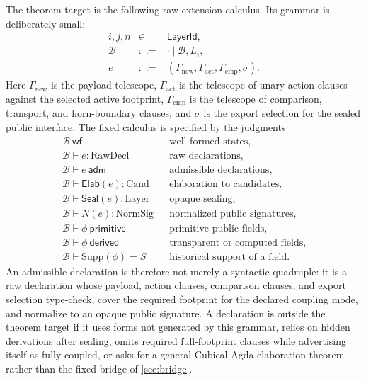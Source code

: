 \documentclass{lmcs}
\newcommand{\B}{\mathcal{B}}
\newcommand{\RawDecl}{\mathrm{RawDecl}}
\newcommand{\Cand}{\mathrm{Cand}}
\newcommand{\Layer}{\mathrm{Layer}}
\newcommand{\NormSig}{\mathrm{NormSig}}
\newcommand{\Supp}{\mathrm{Supp}}
\begin{document}
The theorem target is the following raw extension calculus. Its grammar is deliberately small:
\[
\begin{array}{rcl}
  i,j,n &\in& \mathsf{LayerId},\\
  \B   &::=& \cdot \mid \B,L_i,\\
  e    &::=& (\Gamma_{\mathrm{new}},\Gamma_{\mathrm{act}},\Gamma_{\mathrm{cmp}},\sigma).
\end{array}
\]
Here $\Gamma_{\mathrm{new}}$ is the payload telescope, $\Gamma_{\mathrm{act}}$ is the telescope of unary action clauses against the selected active footprint, $\Gamma_{\mathrm{cmp}}$ is the telescope of comparison, transport, and horn-boundary clauses, and $\sigma$ is the export selection for the sealed public interface. The fixed calculus is specified by the judgments
\[
\begin{array}{rcl}
  \B\ \mathsf{wf} && \text{well-formed states},\\
  \B \vdash e : \RawDecl && \text{raw declarations},\\
  \B \vdash e\ \mathsf{adm} && \text{admissible declarations},\\
  \B \vdash \mathsf{Elab}(e) : \Cand && \text{elaboration to candidates},\\
  \B \vdash \mathsf{Seal}(e) : \Layer && \text{opaque sealing},\\
  \B \vdash N(e) : \NormSig && \text{normalized public signatures},\\
  \B \vdash \phi\ \mathsf{primitive} && \text{primitive public fields},\\
  \B \vdash \phi\ \mathsf{derived} && \text{transparent or computed fields},\\
  \B \vdash \Supp(\phi)=S && \text{historical support of a field}.
\end{array}
\]
An admissible declaration is therefore not merely a syntactic quadruple: it is a raw declaration whose payload, action clauses, comparison clauses, and export selection type-check, cover the required footprint for the declared coupling mode, and normalize to an opaque public signature. A declaration is outside the theorem target if it uses forms not generated by this grammar, relies on hidden derivations after sealing, omits required full-footprint clauses while advertising itself as fully coupled, or asks for a general Cubical Agda elaboration theorem rather than the fixed bridge of \autoref{sec:bridge}.
\end{document}
